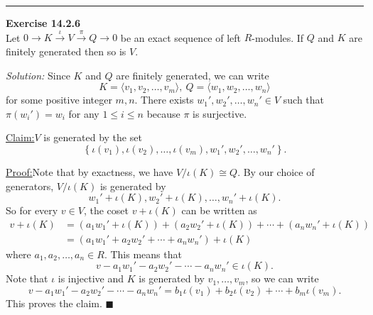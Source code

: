 \documentclass[a4paper, 12pt]{article}
\newenvironment{problem}[2][Exercise]
    { \begin{mdframed}[backgroundcolor=gray!20] \textbf{#1 #2} \\}
    {  \end{mdframed}}
\newenvironment{solution}
    {\textit{Solution:}}
    {}
\newenvironment{claim}[1]{\par\noindent\underline{Claim:}\space#1}{}
\newenvironment{claimproof}[1]{\par\noindent\underline{Proof:}\space#1}{\hfill $\blacksquare$}
\newcommand{\la}{\langle}
\newcommand{\ra}{\rangle}
\begin{document}
\noindent\rule{7in}{2.8pt}
\begin{problem}{14.2.6}
Let \(0\rightarrow K\xrightarrow{\iota} V\xrightarrow{\pi} Q\rightarrow 0\) be an exact sequence of left \(R\)-modules. If \(Q\) and \(K\) are finitely generated then so is \(V\).
\end{problem}
\begin{solution}
Since \(K\) and \(Q\) are finitely generated, we can write 
\[K=\la v_1,v_2,\ldots,v_m\ra,\ Q=\la w_1,w_2,\ldots,w_n\ra\]
for some positive integer \(m,n\). There exists \(w_1',w_2',\ldots,w_n'\in V\) such that \(\pi(w_i')=w_i\) for any \(1\leq i\leq n\) because \(\pi\) is surjective. 

\begin{claim}
\(V\) is generated by the set 
\[\left\{ \iota(v_1),\iota(v_2),\ldots,\iota(v_m),w_1',w_2',\ldots,w_n' \right\}.\]
\end{claim}
\begin{claimproof}
Note that by exactness, we have \(V/\iota(K)\cong Q\). By our choice of generators, \(V/\iota(K)\) is generated by 
\[w_1'+\iota(K),w_2'+\iota(K),\ldots,w_n'+\iota(K).\]
So for every \(v\in V\), the coset \(v+\iota(K)\) can be written as 
\begin{align*} 
v+\iota(K)&=(a_1w_1'+\iota(K))+(a_2w_2'+\iota(K))+\cdots+(a_nw_n'+\iota(K))\\ 
          &=(a_1w_1'+a_2w_2'+\cdots+a_nw_n')+\iota(K)
\end{align*}
where \(a_1,a_2,\ldots,a_n\in R\). This means that 
\[v-a_1w_1'-a_2w_2'-\cdots-a_nw_n'\in \iota(K).\]
Note that \(\iota\) is injective and \(K\) is generated by \(v_1,\ldots,v_m\), so we can write 
\[v-a_1w_1'-a_2w_2'-\cdots-a_nw_n'=b_1\iota(v_1)+b_2\iota(v_2)+\cdots+b_m\iota(v_m).\]
This proves the claim.
\end{claimproof}
\end{solution}
\end{document}
